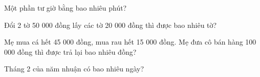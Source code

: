 \begin{ex}
Một phần tư giờ bằng bao nhiêu phút?
\end{ex}

\begin{ex}
Đổi 2 tờ 50 000 đồng lấy các tờ 20 000 đồng thì được bao nhiêu tờ?
\end{ex}

\begin{ex}
Mẹ mua cá hết 45 000 đồng, mua rau hết 15 000 đồng. Mẹ đưa cô bán hàng 100 000 đồng thì được trả lại bao nhiêu đồng?
\end{ex}

\begin{ex}
Tháng 2 của năm nhuận có bao nhiêu ngày?
\end{ex}

